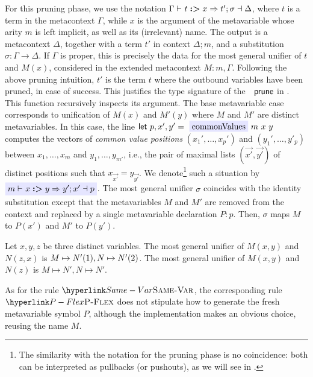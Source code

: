 For this pruning phase, we use the notation $\Gamma\vdash_{}t\boldsymbol{:>}x\Rightarrow t';\sigma\dashv\Delta$,
where $t$ is a term in the metacontext $\Gamma$, while $x$ is the
argument of the metavariable whose arity $m$ is left implicit, as
well as its (irrelevant) name. The output is a metacontext $\Delta$,
together with a term $t'$ in context $\Delta;m$, and a substitution
$\sigma:\Gamma\rightarrow\Delta$. If $\Gamma$ is proper, this is
precisely the data for the most general unifier of $t$ and $M(x)$,
considered in the extended metacontext $M:m,\Gamma$. Following the
above pruning intuition, $t'$ is the term $t$ where the outbound
variables have been pruned, in case of success. This justifies the
type signature of the $\AgdaFunction{prune}$ in .
This function recursively inspects its argument. The base metavariable
case corresponds to unification of $M(x)$ and $M'(y)$ where $M$
and $M'$ are distinct metavariables. In this case, the line $\AgdaKeyword{let}\ p,x',y'=\AgdaFunction{commonValues}\ m\ x\ y$
computes the vectors of \emph{common value positions }$(x_{1}',\dots,x_{p}')$
and $(y_{1}',\dots,y'_{p})$ between $x_{1},\dots,x_{m}$ and $y_{1},\dots,y_{m'}$,
i.e., the pair of maximal lists $(\vec{x'},\vec{y'})$ of distinct
positions such that $x_{\vec{x'}}=y_{\vec{y'}}$. We denote\footnote{The similarity with the notation for the pruning phase is no coincidence:
both can be interpreted as pullbacks (or pushouts), as we will see
in .} such a situation by $\highlighted{m\prunecat xy{x'\dashv p}{y'}{}}$.
The most general unifier $\sigma$ coincides with the identity substitution
except that the metavariables $M$ and $M'$ are removed from the
context and replaced by a single metavariable declaration $P:p$.
Then, $\sigma$ maps $M$ to $P(x')$ and $M'$ to $P(y')$.
\begin{example}
Let $x,y,z$ be three distinct variables. The most general unifier
of $M(x,y)$ and $N(z,x)$ is $M\mapsto N'(1),N\mapsto N'(2)$.
The most general unifier of $M(x,y)$ and $N(z)$ is $M\mapsto N',N\mapsto N'$.
\end{example}
As for the rule $\refrule{Same-Var}$, the corresponding rule $\refrule{P-Flex}$
does not stipulate how to generate the fresh metavariable symbol $P$,
although the implementation makes an obvious choice, reusing the name
$M$.

